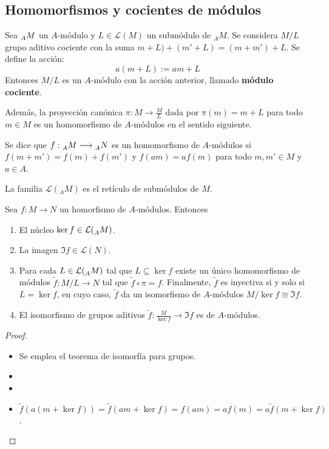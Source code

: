 \subsection{Homomorfismos y cocientes de módulos}

\begin{prop}
  Sea \(\prescript{}{A}{M}\) un \(A\)-módulo y \(L\in\mathcal{L}(M)\) un submódulo
  de \({}_AM\). Se considera \(M/L\) grupo aditivo cociente con la suma
  \(m + L) + (m' + L) = (m + m') + L\). Se define la acción:
  \[
    a(m+L):=am+L
  \]
  Entonces \(M/L\) es un \(A\)-módulo con la acción anterior, llamado
  \textbf{módulo cociente}.
\end{prop}

Además, la proyección canónica \(\pi: M \longrightarrow \frac{M}{L}\) dada por
\(\pi(m) = m + L\) para todo \(m \in M\) es un homomorfismo de \(A\)-módulos en el
sentido siguiente.

\begin{df}
  Se dice que
  \(f:\prescript{}{A}{M}\longrightarrow \prescript{}{A}{N}\)
  es un homomorfismo de \(A\)-módulos si \(f(m + m') = f(m) + f(m')\) y \(f(am) = af(m)\)
  para todo \(m, m' \in M\) y \(a \in A\).
\end{df}

\begin{nt}
  La familia \(\mathcal{L}({}_AM)\) es el retículo de submódulos de \(M\).
\end{nt}

\begin{teo}
  Sea \(f : M \longrightarrow N\) un homorfismo de \(A\)-módulos. Entonces
  \begin{enumerate}
  \item El núcleo \(\ker f \in \mathcal{L}(\prescript{}{A}{M})\).
  \item La imagen \(\Im f \in \mathcal{L}(N)\).
  \item Para cada \(L \in \mathcal{L}(\prescript{}{A}{M})\) tal que
    \(L \subseteq \ker f\) existe un único homomorfismo de módulos
    \(\tilde{f} : M/L \longrightarrow N\)
    tal que \(\tilde{f}\circ\pi=f\). Finalmente, \(\tilde{f}\) es
    inyectiva si y solo si \(L=\ker f\), en cuyo caso, \(\tilde{f}\)
    da un isomorfismo de \(A\)-módulos
    \(M/\ker f\cong \Im f\).

  \item El isomorfismo de grupos aditivos \(\tilde{f}: \frac{M}{\ker f} \longrightarrow
    \Im f\) es de \(A\)-módulos.
  \end{enumerate}
\end{teo}
\begin{proof}
  \begin{itemize}
  \item Se emplea el teorema de isomorfía para grupos.
  \item
  \item
  \item \(\tilde{f}(a(m + \ker f)) = \tilde{f}(am + \ker f) = f(am) = af(m) =
    a\tilde{f}(m + \ker f)\).
  \end{itemize}
\end{proof}


